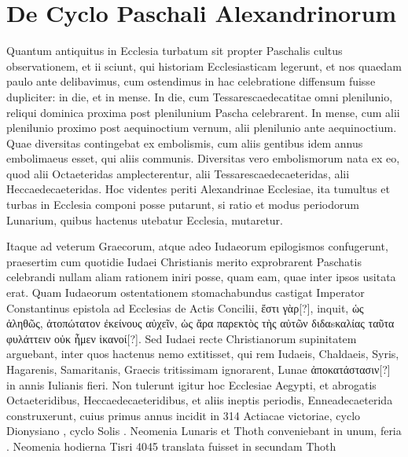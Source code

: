 \section{De Cyclo Paschali Alexandrinorum}
%
Quantum antiquitus in Ecclesia turbatum sit propter Paschalis
cultus observationem, et ii sciunt, qui historiam Ecclesiasticam
legerunt, et nos quaedam paulo ante delibavimus, cum
ostendimus in hac celebratione diffensum fuisse dupliciter: in die, et
in mense.
In die, cum Tessarescaedecatitae omni plenilunio, reliqui
dominica proxima post plenilunium Pascha celebrarent.
In mense,
cum alii plenilunio proximo post aequinoctium vernum, alii plenilunio
ante aequinoctium.
Quae diversitas contingebat ex embolismis,
cum aliis gentibus idem annus embolimaeus esset, qui aliis communis.
Diversitas vero embolismorum nata ex eo, quod alii Octaeteridas
amplecterentur, alii Tessarescaedecaeteridas, alii Heccaedecaeteridas.
Hoc videntes periti Alexandrinae Ecclesiae, ita tumultus et
turbas in Ecclesia componi posse putarunt, si ratio et modus periodorum
Lunarium, quibus hactenus utebatur Ecclesia, mutaretur.
%
\begin{table}[tb]
  
\end{table}
%
Itaque
ad veterum Graecorum, atque adeo Iudaeorum epilogismos confugerunt,
praesertim cum quotidie Iudaei
Christianis merito exprobrarent Paschatis
celebrandi nullam aliam rationem iniri
posse, quam eam, quae inter ipsos usitata
erat.
Quam Iudaeorum ostentationem
stomachabundus castigat Imperator Constantinus
epistola ad Ecclesias de Actis
Concilii, \textgreek{ἔστι γὰρ[?]}, inquit, \textgreek{ὡς ἀληθῶς, ἀτοπώτατον
ἐκείνους αὐχεῖν, ὡς ἄρα παρεκτὸς τὴς αὐτῶν
διδαsκαλίας ταῦτα φυλάττειν οὐκ ἦμεν ἱκανοί[?]}.
Sed Iudaei recte Christianorum supinitatem
arguebant, inter quos hactenus
nemo extitisset, qui rem Iudaeis, Chaldaeis,
Syris, Hagarenis, Samaritanis, Graecis
tritissimam ignorarent, Lunae \textgreek{ἀποκατάστασιν[?]}
in  annis Iulianis fieri.
Non
tulerunt igitur hoc Ecclesiae Aegypti, et
abrogatis Octaeteridibus, Heccaedecaeteridibus,
et aliis ineptis periodis, Enneadecaeterida
construxerunt, cuius primus
annus incidit in 314 Actiacae victoriae, cyclo Dionysiano , cyclo
Solis .
Neomenia Lunaris et Thoth conveniebant in unum, feria
.
Neomenia hodierna Tisri 4045 translata fuisset in secundam %
 Thoth
